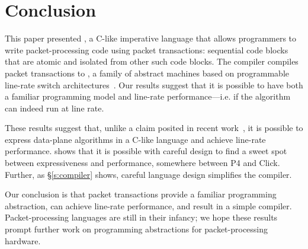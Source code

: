 \section{Conclusion}
\label{s:conclusion}

This paper presented \pktlanguage, a C-like imperative language that allows
programmers to write packet-processing code using packet transactions:
sequential code blocks that are atomic and isolated from other such code
blocks. The \pktlanguage compiler compiles packet transactions to \absmachine,
a family of abstract machines based on programmable line-rate switch
architectures~\cite{flexpipe, xpliant, rmt}. Our results suggest that it is
possible to have both a familiar programming model and line-rate
performance---i.e. if the algorithm can indeed run at line rate.

These results suggest that, unlike a claim posited in recent
work~\cite{p4}, it is possible to express data-plane algorithms in a
C-like language and achieve line-rate performance. \pktlanguage shows
that it is possible with careful design to find a sweet spot between
expressiveness and performance, somewhere between P4 and Click.
Further, as \S\ref{s:compiler} shows, careful language design
simplifies the compiler.  

Our conclusion is that packet transactions provide a familiar
programming abstraction, can achieve line-rate performance, and result
in a simple compiler.  Packet-processing languages are still in their
infancy; we hope these results prompt further work on programming
abstractions for packet-processing hardware.
